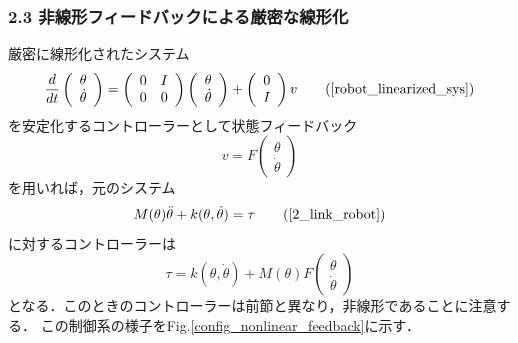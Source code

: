 \begin{frame}[t]
\frametitle{2.3 非線形フィードバックによる厳密な線形化}
厳密に線形化されたシステム
\begin{equation}
 \frac{d}{dt}
  \left(\begin{array}{c}
   \theta \\
	 \dot{\theta}
	\end{array}\right)
  =
  \left(\begin{array}{cc}
   0 & I \\
	 0 & 0 
	\end{array}\right)
  \left(\begin{array}{c}
   \theta \\
	 \dot{\theta}
	\end{array}\right)
  +
  \left(\begin{array}{c}
   0 \\
	 I
	\end{array}\right)
  v
  \tag{\ref{robot_linearized_sys}}
\end{equation}
を安定化するコントローラーとして状態フィードバック
\begin{equation}
 v = F
  \left(\begin{array}{c}
   \theta \\
	 \dot{\theta}
	\end{array}\right)
\end{equation}
を用いれば，元のシステム
\begin{equation}
 M(\theta) \ddot{\theta} + k(\theta, \dot{\theta}) = \tau
  \tag{\ref{2_link_robot}}
\end{equation}
に対するコントローラーは
\begin{equation}
 \tau = k(\theta, \dot{\theta}) + M(\theta) F
  \left(\begin{array}{c}
   \theta \\
	 \dot{\theta}
	\end{array}\right)
\end{equation}
となる．このときのコントローラーは前節と異なり，非線形であることに注意する．
この制御系の様子をFig.\ref{config_nonlinear_feedback}に示す．
\end{frame}

